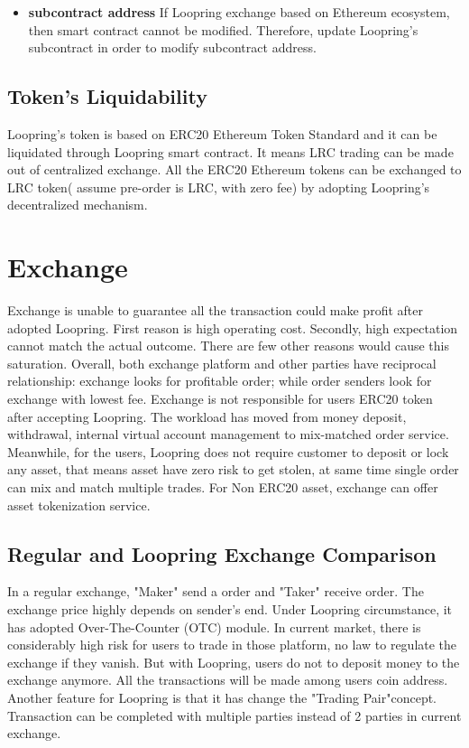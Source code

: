 \documentclass[UTF8,nofonts]{article}
\begin{document}
\begin{itemize}
   \item \textbf{subcontract address} If Loopring exchange based on Ethereum ecosystem,  then smart contract cannot be modified. Therefore,  update Loopring's subcontract in order to modify subcontract address.
 \end{itemize}


\subsection{Token's Liquidability}

Loopring's token is based on ERC20 Ethereum Token Standard and it can be liquidated through Loopring smart contract. It means LRC trading can be made out of centralized exchange. All the ERC20 Ethereum tokens can be exchanged to LRC token( assume pre-order is LRC,  with zero fee) by adopting Loopring's decentralized mechanism.


\section{Exchange\label{sec: exchange}}

Exchange is unable to guarantee all the transaction could make profit after adopted Loopring. First reason is high operating cost. Secondly,  high expectation cannot match the actual outcome. There are few other reasons would cause this saturation. Overall,  both exchange platform and other parties have reciprocal relationship: exchange looks for profitable order; while order senders look for exchange with lowest fee.
Exchange is not responsible for users ERC20 token after accepting Loopring. The workload has moved from money deposit,  withdrawal,  internal virtual account management to mix-matched order service. Meanwhile,  for the users,  Loopring does not require customer to deposit or lock any asset, that means asset have zero risk to get stolen, at same time single order can mix and match multiple trades.
For Non ERC20 asset,  exchange can offer asset tokenization service.

\subsection{Regular and Loopring Exchange Comparison}
In a regular exchange,  "Maker" send a order and "Taker" receive order. The exchange price highly depends on sender's end. Under Loopring circumstance,  it has adopted Over-The-Counter (OTC) module.
In current market,  there is considerably high risk for users to trade in those platform,  no law to regulate the exchange if they vanish. But with Loopring,  users do not to deposit money to the exchange anymore. All the transactions will be made among users coin address.
Another feature for Loopring is that it has change the "Trading Pair"concept. Transaction can be completed with multiple parties instead of 2 parties in current exchange.
\end{document}
